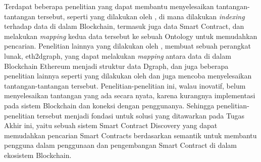 Terdapat beberapa penelitian yang dapat membantu menyelesaikan tantangan-tantangan tersebut, seperti yang dilakukan oleh \cite{third2017linked}, di mana dilakukan \textit{indexing} terhadap data di dalam Blockchain, termasuk juga data Smart Contract, dan melakukan \textit{mapping} kedua data tersebut ke sebuah Ontology untuk memudahkan pencarian. Penelitian lainnya yang dilakukan oleh \cite{aimar2023extraction}, membuat sebuah perangkat lunak, eth2dgraph, yang dapat melakukan \textit{mapping} antara data di dalam Blockchain Ethereum menjadi struktur data Dgraph, dan juga beberapa penelitian lainnya seperti yang dilakukan oleh \cite{baqa2019semantic} dan \cite{cano2021toward} juga mencoba menyelesaikan tantangan-tantangan tersebut. Penelitian-penelitian ini, walau inovatif, belum menyelesaikan tantangan yang ada secara nyata, karena kurangnya implementasi pada sistem Blockchain dan koneksi dengan penggunanya. Sehingga penelitian-penelitian tersebut menjadi fondasi untuk solusi yang ditawarkan pada Tugas Akhir ini, yaitu sebuah sistem Smart Contract Discovery yang dapat memudahkan pencarian Smart Contracts berdasarkan semantik untuk membantu pengguna dalam penggunaan dan pengembangan Smart Contract di dalam ekosistem Blockchain.





